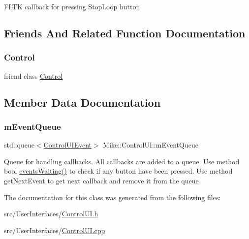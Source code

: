 F\+L\+TK callback for pressing Stop\+Loop button 

\subsection{Friends And Related Function Documentation}
\mbox{\label{class_mike_1_1_control_u_i_a9adf7c444a8611024541177662d4716a}} 
\subsubsection{\texorpdfstring{Control}{Control}}
{\footnotesize\ttfamily friend class \hyperlink{class_mike_1_1_control}{Control}\hspace{0.3cm}{\ttfamily [friend]}}



\subsection{Member Data Documentation}
\mbox{\label{class_mike_1_1_control_u_i_ae46585298dfd8ddb97a4d64168cc39e1}} 
\subsubsection{\texorpdfstring{m\+Event\+Queue}{mEventQueue}}
{\footnotesize\ttfamily std\+::queue$<$\hyperlink{struct_mike_1_1_control_u_i_event}{Control\+U\+I\+Event}$>$ Mike\+::\+Control\+U\+I\+::m\+Event\+Queue\hspace{0.3cm}{\ttfamily [private]}}

Queue for handling callbacks. All callbacks are added to a queue. Use method bool \hyperlink{class_mike_1_1_control_u_i_afb11a656dc093a18fd3f12f9b9709418}{events\+Waiting()} to check if any button have been pressed. Use method get\+Next\+Event to get next callback and remove it from the queue 

The documentation for this class was generated from the following files\+:\begin{DoxyCompactItemize}
\item 
src/\+User\+Interfaces/\hyperlink{_control_u_i_8h}{Control\+U\+I.\+h}\item 
src/\+User\+Interfaces/\hyperlink{_control_u_i_8cpp}{Control\+U\+I.\+cpp}\end{DoxyCompactItemize}
